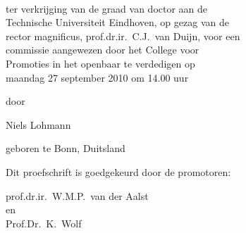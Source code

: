 \begin{center}
${}$
\vspace{3em}

\\\vspace{0.3em}

\vspace{3em}
\large
{}

\vspace{3em}

ter verkrijging van de graad van doctor aan de\\
Technische Universiteit Eindhoven, op gezag van de\\
rector magnificus, prof.dr.ir.\ C.J.\ van Duijn, voor een\\
commissie aangewezen door het College voor\\
Promoties in het openbaar te verdedigen op\\
maandag 27 september 2010 om 14.00 uur

\vspace{3em}

door

\vspace{3em}

Niels Lohmann

\vspace{3em}

geboren te Bonn, Duitsland
\end{center}
\pagebreak
\thispagestyle{empty}

\noindent Dit proefschrift is goedgekeurd door de promotoren:\vspace{3em}


\noindent prof.dr.ir.\ W.M.P.\ van der Aalst\\
en\\
Prof.Dr.\ K.\ Wolf



\thispagestyle{empty}
\normalsize
\cleardoublepage
\thispagestyle{empty}

